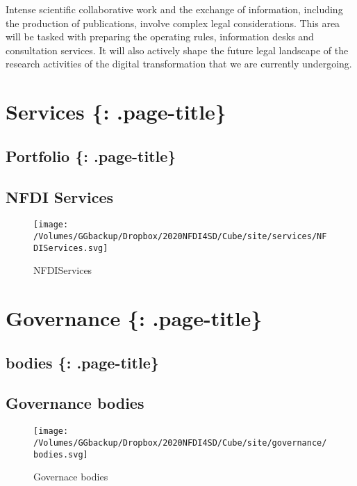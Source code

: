 Intense scientific collaborative work and the exchange of information,
including the production of publications, involve complex legal
considerations. This area will be tasked with preparing the operating
rules, information desks and consultation services. It will also
actively shape the future legal landscape of the research activities of
the digital transformation that we are currently undergoing.

\hypertarget{services-.page-title}{%
\section{Services \{: .page-title\}}\label{services-.page-title}}

\hypertarget{portfolio-.page-title}{%
\subsection{Portfolio \{: .page-title\}}\label{portfolio-.page-title}}

\hypertarget{nfdi-services}{%
\subsection{NFDI Services}\label{nfdi-services}}

\begin{figure}
\centering
\texttt{[image: /Volumes/GGbackup/Dropbox/2020NFDI4SD/Cube/site/services/NFDIServices.svg]}
\caption{NFDIServices}
\end{figure}

\hypertarget{governance-.page-title}{%
\section{Governance \{: .page-title\}}\label{governance-.page-title}}

\hypertarget{bodies-.page-title}{%
\subsection{bodies \{: .page-title\}}\label{bodies-.page-title}}

\hypertarget{governance-bodies}{%
\subsection{Governance bodies}\label{governance-bodies}}

\begin{figure}
\centering
\texttt{[image: /Volumes/GGbackup/Dropbox/2020NFDI4SD/Cube/site/governance/bodies.svg]}
\caption{Governace bodies}
\end{figure}

